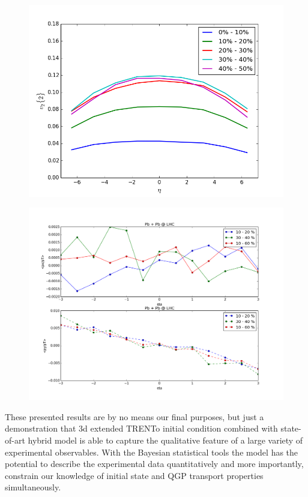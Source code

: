 \documentclass[aps,prl,twocolumn,groupedaddress]{revtex4-1}
\begin{document}
	\begin{figure}
  	\centering
	\includegraphics[width=\columnwidth]{pics/new-PbPb-vnm-eta-p1.png}
	\caption{}
  	\label{PbPb-vn-eta-calc}
	\end{figure}
	
	\begin{figure}
  	\centering
	\includegraphics[width=\columnwidth]{pics/RUN-1-PbPb-v1-eta.png}
	\caption{}
  	\label{RUN-1-PbPb-v1-eta}
	\end{figure}
	
	These presented results are by no means our final purposes, but just a demonstration that 3d extended TRENTo initial condition combined with state-of-art hybrid model is able to capture the qualitative feature of a large variety of experimental observables.
	With the Bayesian statistical tools the model has the potential to describe the experimental data quantitatively and more importantly, constrain our knowledge of initial state and QGP transport properties simultaneously.
	
\end{document}
